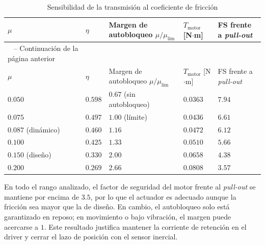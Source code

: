 \documentclass[../../General.tex]{subfiles}
\begin{document}
\begin{center}
    \footnotesize
    \begin{xltabular}{\textwidth}{|>{\centering\arraybackslash}X|>{\centering\arraybackslash}X|>{\centering\arraybackslash}X|>{\centering\arraybackslash}X|>{\centering\arraybackslash}X|}
        \caption{Sensibilidad de la transmisión al coeficiente de fricción\label{tab:sensibilidad_mu_tilt}} \\
        \hline
        $\mu$ & $\eta$ & Margen de autobloqueo $\mu/\mu_{\text{lím}}$ & $T_{\text{motor}}$ [N$\cdot$m] & FS frente a \textit{pull-out} \\ \hline
        \endfirsthead

        {\tablename\ \thetable{} -- Continuación de la página anterior} \\
        \hline
        $\mu$ & $\eta$ & Margen de autobloqueo $\mu/\mu_{\text{lím}}$ & $T_{\text{motor}}$ [N$\cdot$m] & FS frente a \textit{pull-out} \\ \hline
        \endhead

        \hline
        \endfoot

        \hline
        \endlastfoot

        $0.050$ & $0.598$ & $0.67$ (sin autobloqueo) & $0.0363$ & $7.94$ \\ \hline
        $0.075$ & $0.497$ & $1.00$ (límite) & $0.0436$ & $6.61$ \\ \hline
        $0.087$ (dinámico) & $0.460$ & $1.16$ & $0.0472$ & $6.12$ \\ \hline
        $0.100$ & $0.425$ & $1.33$ & $0.0510$ & $5.66$ \\ \hline
        $0.150$ (diseño) & $0.330$ & $2.00$ & $0.0658$ & $4.38$ \\ \hline
        $0.200$ & $0.269$ & $2.66$ & $0.0808$ & $3.57$ \\ \hline
    \end{xltabular}
\end{center}

En todo el rango analizado, el factor de seguridad del motor frente al \textit{pull-out} se mantiene por encima de $3.5$, por lo que el actuador es adecuado aunque la fricción sea mayor que la de diseño. En cambio, el autobloqueo solo está garantizado en reposo; en movimiento o bajo vibración, el margen puede acercarse a $1$. Este resultado justifica mantener la corriente de retención en el driver y cerrar el lazo de posición con el sensor inercial.
\end{document}
